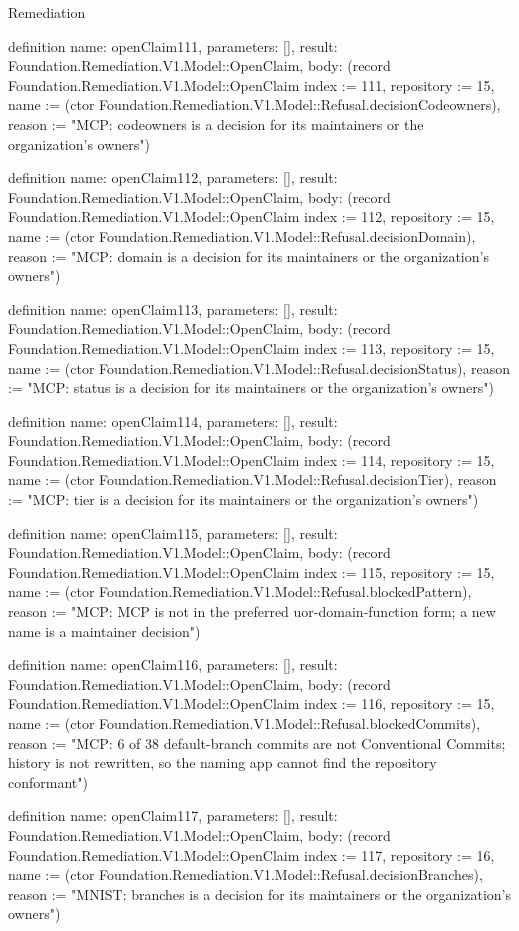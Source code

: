 \begin{lexlean}{Remediation}
\begin{semanticmodule}
definition{
  name: openClaim111,
  parameters: [],
  result: Foundation.Remediation.V1.Model::OpenClaim,
  body: (record Foundation.Remediation.V1.Model::OpenClaim {index := 111, repository := 15, name := (ctor Foundation.Remediation.V1.Model::Refusal.decisionCodeowners), reason := "MCP: codeowners is a decision for its maintainers or the organization's owners"})
}

definition{
  name: openClaim112,
  parameters: [],
  result: Foundation.Remediation.V1.Model::OpenClaim,
  body: (record Foundation.Remediation.V1.Model::OpenClaim {index := 112, repository := 15, name := (ctor Foundation.Remediation.V1.Model::Refusal.decisionDomain), reason := "MCP: domain is a decision for its maintainers or the organization's owners"})
}

definition{
  name: openClaim113,
  parameters: [],
  result: Foundation.Remediation.V1.Model::OpenClaim,
  body: (record Foundation.Remediation.V1.Model::OpenClaim {index := 113, repository := 15, name := (ctor Foundation.Remediation.V1.Model::Refusal.decisionStatus), reason := "MCP: status is a decision for its maintainers or the organization's owners"})
}

definition{
  name: openClaim114,
  parameters: [],
  result: Foundation.Remediation.V1.Model::OpenClaim,
  body: (record Foundation.Remediation.V1.Model::OpenClaim {index := 114, repository := 15, name := (ctor Foundation.Remediation.V1.Model::Refusal.decisionTier), reason := "MCP: tier is a decision for its maintainers or the organization's owners"})
}

definition{
  name: openClaim115,
  parameters: [],
  result: Foundation.Remediation.V1.Model::OpenClaim,
  body: (record Foundation.Remediation.V1.Model::OpenClaim {index := 115, repository := 15, name := (ctor Foundation.Remediation.V1.Model::Refusal.blockedPattern), reason := "MCP: MCP is not in the preferred uor-{domain}-{function} form; a new name is a maintainer decision"})
}

definition{
  name: openClaim116,
  parameters: [],
  result: Foundation.Remediation.V1.Model::OpenClaim,
  body: (record Foundation.Remediation.V1.Model::OpenClaim {index := 116, repository := 15, name := (ctor Foundation.Remediation.V1.Model::Refusal.blockedCommits), reason := "MCP: 6 of 38 default-branch commits are not Conventional Commits; history is not rewritten, so the naming app cannot find the repository conformant"})
}

definition{
  name: openClaim117,
  parameters: [],
  result: Foundation.Remediation.V1.Model::OpenClaim,
  body: (record Foundation.Remediation.V1.Model::OpenClaim {index := 117, repository := 16, name := (ctor Foundation.Remediation.V1.Model::Refusal.decisionBranches), reason := "MNIST: branches is a decision for its maintainers or the organization's owners"})
}


\end{semanticmodule}
\end{lexlean}
